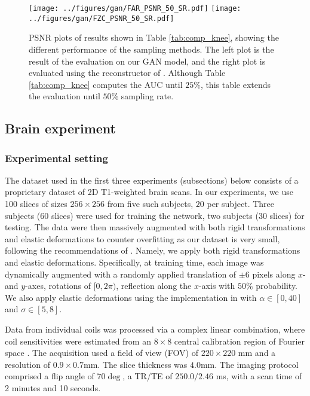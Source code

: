 \begin{figure}[!ht]
    \centering
    \texttt{[image: ../figures/gan/FAR\_PSNR\_50\_SR.pdf]}
    \texttt{[image: ../figures/gan/FZC\_PSNR\_50\_SR.pdf]}
    \caption{PSNR plots of results shown in Table \ref{tab:comp_knee}, showing the different performance of the sampling methods. The left plot is the result of the evaluation on our GAN model, and the right plot is evaluated using the reconstructor of \citet{zhang2019reducing}. Although Table \ref{tab:comp_knee} computes the AUC until $25\%$, this table extends the evaluation until $50\%$ sampling rate.}\label{fig:knee_curve_psnr}
\end{figure}


\subsection{Brain experiment}\label{ss:app_brain}

\subsubsection{Experimental setting}
The dataset used in the first three experiments (subsections) below consists of a proprietary dataset of 2D T1-weighted brain scans. In our experiments, we use 100 slices of sizes $256\times 256$ from five such subjects, $20$ per subject. Three subjects ($60$ slices) were used for training the network, two subjects ($30$ slices) for testing. The data were then massively augmented with both rigid transformations and elastic deformations to counter overfitting as our dataset is very small, following the recommendations of \citet{ronneberger2015u,schlemper2017deep}. Namely, we apply both rigid transformations and elastic deformations. Specifically, at training time, each image was dynamically augmented with a randomly applied translation of $\pm 6$ pixels along $x$- and $y$-axes, rotations of $[0, 2\pi)$, reflection along the $x$-axis with $50\%$ probability. We also apply elastic deformations using the implementation in \citep{simard2003best}with $\alpha \in [0, 40]$ and $\sigma \in [5, 8]$. 

Data from individual coils was processed via a complex linear combination, where coil sensitivities were estimated from an $8\times 8$ central calibration region of Fourier space \citep{bydder2002combination}. The acquisition used a field of view (FOV) of $220\times 220$ mm and a resolution of $0.9\times 0.7 $mm. The slice thickness was $4.0$mm. The imaging protocol comprised a flip angle of $70\deg$, a TR/TE of $250.0/2.46$ ms, with a scan time of 2 minutes and 10 seconds.

